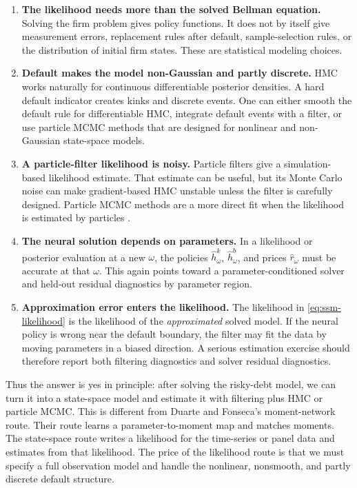 \documentclass[11pt]{article}
\newcommand{\1}{\mathbf{1}}
\begin{document}
\begin{enumerate}[leftmargin=2em]
  \item \textbf{The likelihood needs more than the solved Bellman equation.}
  Solving the firm problem gives policy functions. It does not by itself give
  measurement errors, replacement rules after default, sample-selection rules,
  or the distribution of initial firm states. These are statistical modeling
  choices.

  \item \textbf{Default makes the model non-Gaussian and partly discrete.}
  HMC works naturally for continuous differentiable posterior densities. A hard
  default indicator creates kinks and discrete events. One can either smooth
  the default rule for differentiable HMC, integrate default events with a
  filter, or use particle MCMC methods that are designed for nonlinear and
  non-Gaussian state-space models.

  \item \textbf{A particle-filter likelihood is noisy.} Particle filters give a
  simulation-based likelihood estimate. That estimate can be useful, but its
  Monte Carlo noise can make gradient-based HMC unstable unless the filter is
  carefully designed. Particle MCMC methods are a more direct fit when the
  likelihood is estimated by particles \citep{andrieu2010pmcmc}.

  \item \textbf{The neural solution depends on parameters.} In a likelihood or
  posterior evaluation at a new \(\omega\), the policies
  \(\widehat h^k_\omega\), \(\widehat h^b_\omega\), and prices
  \(\widehat r_\omega\) must be accurate at that \(\omega\). This again points
  toward a parameter-conditioned solver and held-out residual diagnostics by
  parameter region.

  \item \textbf{Approximation error enters the likelihood.} The likelihood in
  \cref{eq:ssm-likelihood} is the likelihood of the \emph{approximated} solved
  model. If the neural policy is wrong near the default boundary, the filter
  may fit the data by moving parameters in a biased direction. A serious
  estimation exercise should therefore report both filtering diagnostics and
  solver residual diagnostics.
\end{enumerate}

Thus the answer is yes in principle: after solving the risky-debt model, we can
turn it into a state-space model and estimate it with filtering plus HMC or
particle MCMC. This is different from Duarte and Fonseca's moment-network route.
Their route learns a parameter-to-moment map and matches moments. The
state-space route writes a likelihood for the time-series or panel data and
estimates from that likelihood. The price of the likelihood route is that we
must specify a full observation model and handle the nonlinear, nonsmooth, and
partly discrete default structure.
\end{document}
